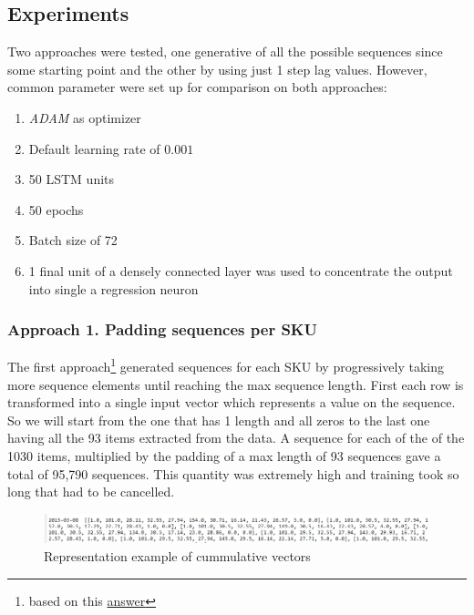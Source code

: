 \documentclass[]{article}
\providecommand{\tightlist}{%
  \setlength{\itemsep}{0pt}\setlength{\parskip}{0pt}}
\let\rmarkdownfootnote\footnote%
\def\footnote{\protect\rmarkdownfootnote}
\theoremstyle{definition}
\theoremstyle{definition}
\theoremstyle{definition}
\theoremstyle{remark}
\begin{document}
\subsection{Experiments}\label{experiments}

Two approaches were tested, one generative of all the possible sequences
since some starting point and the other by using just 1 step lag values.
However, common parameter were set up for comparison on both approaches:

\begin{enumerate}
\def\labelenumi{\arabic{enumi}.}
\tightlist
\item
  \emph{ADAM} as optimizer
\item
  Default learning rate of \(0.001\)
\item
  50 LSTM units
\item
  50 epochs
\item
  Batch size of 72
\item
  1 final unit of a densely connected layer was used to concentrate the
  output into single a regression neuron
\end{enumerate}

\subsubsection{Approach 1. Padding sequences per
SKU}\label{approach-1.-padding-sequences-per-sku}

The first approach\footnote{based on this
  \href{https://stackoverflow.com/questions/39674713/neural-network-lstm-input-shape-from-dataframe}{answer}}
generated sequences for each SKU by progressively taking more sequence
elements until reaching the max sequence length. First each row is
transformed into a single input vector which represents a value on the
sequence. So we will start from the one that has 1 length and all zeros
to the last one having all the 93 items extracted from the data. A
sequence for each of the of the 1030 items, multiplied by the padding of
a max length of 93 sequences gave a total of 95,790 sequences. This
quantity was extremely high and training took so long that had to be
cancelled.

\begin{figure}

{\centering \includegraphics[width=0.3\linewidth]{./media/example_representation1} 

}

\caption{Representation example of cummulative vectors}\label{fig:fig3}
\end{figure}
\end{document}
